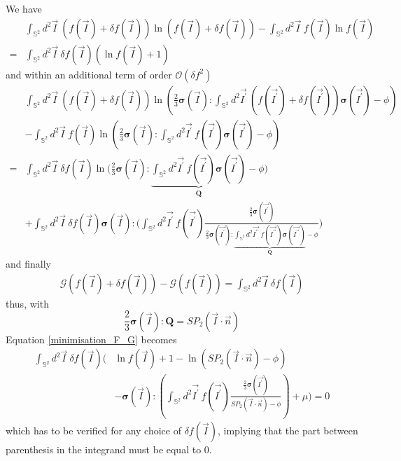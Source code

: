 \documentclass[class=article, float=false, crop=false]{standalone}
\begin{document}
We have
\begin{align*}
&\int_{\mathbb{S}^2}d^2\vec{I}~(f(\vec{I})+\delta f(\vec{I}))\ln(f(\vec{I})+\delta f(\vec{I})) - \int_{\mathbb{S}^2}d^2\vec{I}~f(\vec{I})\ln f(\vec{I})\\
= &\int_{\mathbb{S}^2} d^2\vec{I}~\delta f(\vec{I})(\ln f(\vec{I}) + 1)
\end{align*}
and within an additional term of order $\mathcal{O}(\delta f^2)$
\begin{align*}
&\int_{\mathbb{S}^2}d^2\vec{I}~(f(\vec{I})+\delta f(\vec{I}))\ln\left(\frac{2}{3}\bm{\sigma}(\vec{I}):\int_{\mathbb{S}^2}d^2\vec{I^{\prime}}~(f(\vec{I^{\prime}})+\delta f(\vec{I^{\prime}}))\bm{\sigma}(\vec{I^{\prime}}) - \phi\right)\\
&- \int_{\mathbb{S}^2}d^2\vec{I}~f(\vec{I})\ln\left(\frac{2}{3}\bm{\sigma}(\vec{I}):\int_{\mathbb{S}^2}d^2\vec{I^{\prime}}~f(\vec{I^{\prime}})\bm{\sigma}(\vec{I^{\prime}}) - \phi\right)\\
= &\int_{\mathbb{S}^2}d^2\vec{I}~\delta f(\vec{I}) \ln\Bigg(\frac{2}{3}\bm{\sigma}(\vec{I}):\underbrace{\int_{\mathbb{S}^2}d^2\vec{I^{\prime}}~f(\vec{I^{\prime}})\bm{\sigma}(\vec{I^{\prime}})}_{\bm{Q}}-\phi\Bigg)\\
&+ \int_{\mathbb{S}^2} d^2\vec{I}~\delta f(\vec{I}) \bm{\sigma}(\vec{I}):\Bigg(\int_{\mathbb{S}^2}d^2\vec{I^{\prime}}~f(\vec{I^{\prime}})\frac{\frac{2}{3}\bm{\sigma}(\vec{I^{\prime}})}{\frac{2}{3}\bm{\sigma}(\vec{I^{\prime}}):\underbrace{\int_{\mathbb{S}^2}d^2\vec{I^{\prime\prime}}~f(\vec{I^{\prime\prime}})\bm{\sigma}(\vec{I^{\prime\prime}})}_{\bm{Q}}-\phi}\Bigg)
\end{align*}
and finally
\begin{align*}
\mathcal{G}\left(f(\vec{I})+\delta f(\vec{I})\right) - \mathcal{G}\left(f(\vec{I})\right) = \int_{\mathbb{S}^2} d^2\vec{I}~\delta f(\vec{I})
\end{align*}
thus, with
\begin{equation}
\frac{2}{3}\bm{\sigma}(\vec{I}):\bm{Q} = SP_2(\vec{I}\cdot\vec{n})
\label{sigmaQ}
\end{equation}
Equation \ref{minimisation_F_G} becomes
\begin{equation}
\begin{aligned}
\int_{\mathbb{S}^2}d^2\vec{I}~\delta f(\vec{I}) \Bigg(&\ln f(\vec{I}) + 1 - \ln\left(SP_2(\vec{I}\cdot\vec{n})-\phi\right)\\
&- \bm{\sigma}(\vec{I}):\left(\int_{\mathbb{S}^2}d^2\vec{I^{\prime}}~f(\vec{I^{\prime}})\frac{\frac{2}{3}\bm{\sigma}(\vec{I^{\prime}})}{SP_2(\vec{I}\cdot\vec{n})-\phi}\right)+\mu \Bigg) = 0
\end{aligned}
\label{minimisation_F}
\end{equation}
which has to be verified for any choice of $\delta f(\vec{I})$, implying that the part between parenthesis in the integrand must be equal to 0.\\
\end{document}
